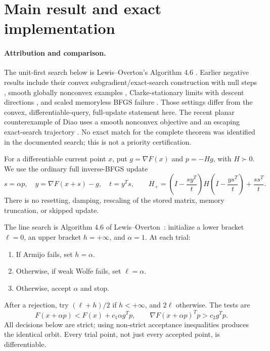 \begingroup
\providecommand{\R}{}
\renewcommand{\R}{\mathbb R}
\providecommand{\B}{}
\renewcommand{\B}{\mathcal B}
\providecommand{\I}{}
\renewcommand{\I}{I}
\setcounter{section}{0}
\setcounter{theorem}{0}
\setcounter{lemma}{0}
\setcounter{corollary}{0}
\setcounter{proposition}{0}
\setcounter{remark}{0}
\setcounter{equation}{0}
\section{Main result and exact implementation}
\paragraph{Attribution and comparison.}
The unit-first search below is Lewis--Overton's Algorithm 4.6 \cite{LO}. Earlier negative results include their convex subgradient/exact-search construction with null steps \cite{NEG_LO08}, smooth globally nonconvex examples \cite{NEG_M04,NEG_M07,NEG_M14,NEG_DAI02,NEG_DAI13}, Clarke-stationary limits with descent directions \cite{NEG_LZ15}, and scaled memoryless BFGS failure \cite{NEG_AO21}. Those settings differ from the convex, differentiable-query, full-update statement here. The recent planar counterexample of Diao uses a smooth nonconvex objective and an escaping exact-search trajectory \cite{NEG_DIAO26}. No exact match for the complete theorem was identified in the documented search; this is not a priority certification.

For a differentiable current point $x$, put $g=\nabla F(x)$ and $p=-Hg$, with $H\succ0$. We use the ordinary full inverse-BFGS update
\begin{equation}\label{D:bfgs}
 s=\alpha p,\quad y=\nabla F(x+s)-g,\quad t=y^Ts,\qquad
 H_+=\left(I-\frac{sy^T}{t}\right)H\left(I-\frac{ys^T}{t}\right)+\frac{ss^T}{t}.
\end{equation}
There is no resetting, damping, rescaling of the stored matrix, memory truncation, or skipped update.

The line search is Algorithm 4.6 of Lewis--Overton~\cite{LO}: initialize a lower bracket $\ell=0$, an upper bracket $h=+\infty$, and $\alpha=1$. At each trial:
\begin{enumerate}
\item If Armijo fails, set $h=\alpha$.
\item Otherwise, if weak Wolfe fails, set $\ell=\alpha$.
\item Otherwise, accept $\alpha$ and stop.
\end{enumerate}
After a rejection, try $(\ell+h)/2$ if $h<+\infty$, and $2\ell$ otherwise. The tests are
\[
 F(x+\alpha p)<F(x)+c_1\alpha g^Tp,
 \qquad \nabla F(x+\alpha p)^Tp>c_2g^Tp.
\]
All decisions below are strict; using non-strict acceptance inequalities produces the identical orbit. Every trial point, not just every accepted point, is differentiable.

